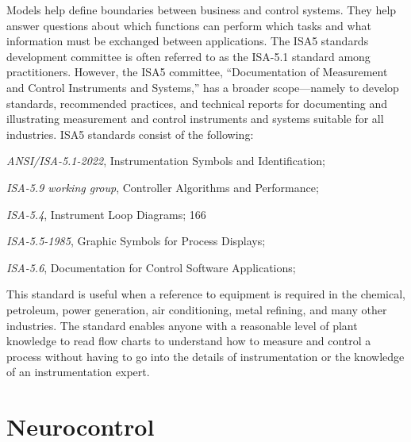 \documentclass[10pt, a4paper]{proc}
\begin{document}
{ Models help define boundaries between business and
control systems. They help answer questions about which
functions can perform which tasks and what information
must be exchanged between applications. The ISA5 standards development committee is often referred to as the
ISA-5.1 standard among practitioners. However, the ISA5
committee, “Documentation of Measurement and Control
Instruments and Systems,” has a broader scope—namely
to develop standards, recommended practices, and technical reports for documenting and illustrating measurement
and control instruments and systems suitable for all
industries. ISA5 standards consist of the following:

\begin{itemize}[noitemsep]
\normalsize{
\item \textit{ANSI/ISA-5.1-2022}, Instrumentation Symbols and
Identification;
\item \textit{ISA-5.9 working group}, Controller Algorithms and
Performance;
\item \textit{ISA-5.4}, Instrument Loop Diagrams;
166
\item \textit{ISA-5.5-1985}, Graphic Symbols for Process Displays;
\item \textit{ISA-5.6}, Documentation for Control Software Applications;}
\end{itemize}

This standard is useful when a reference to equipment
is required in the chemical, petroleum, power generation,
air conditioning, metal refining, and many other industries. The standard enables anyone with a reasonable level
of plant knowledge to read flow charts to understand how
to measure and control a process without having to go
into the details of instrumentation or the knowledge of
an instrumentation expert.
 
 \section{\normalsize{Neurocontrol}}

}
\end{document}
